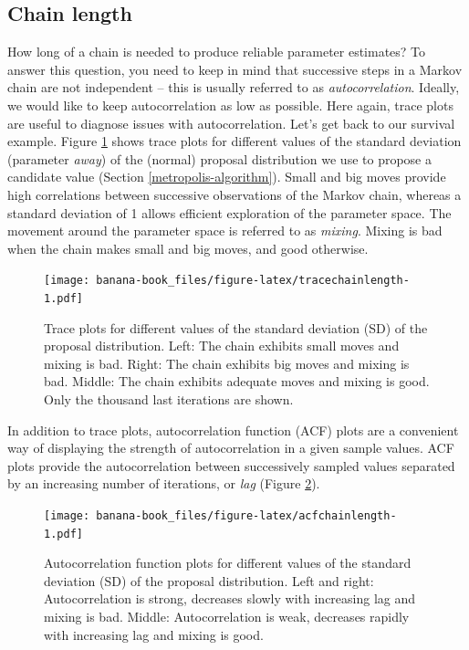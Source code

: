 \documentclass[
  12pt,
]{krantz}
\begin{document}
\hypertarget{chain-length}{%
\subsection{Chain length}\label{chain-length}}

How long of a chain is needed to produce reliable parameter estimates? To answer this question, you need to keep in mind that successive steps in a Markov chain are not independent -- this is usually referred to as \emph{autocorrelation}. Ideally, we would like to keep autocorrelation as low as possible. Here again, trace plots are useful to diagnose issues with autocorrelation. Let's get back to our survival example. Figure \ref{fig:tracechainlength} shows trace plots for different values of the standard deviation (parameter \emph{away}) of the (normal) proposal distribution we use to propose a candidate value (Section \ref{metropolis-algorithm}). Small and big moves provide high correlations between successive observations of the Markov chain, whereas a standard deviation of 1 allows efficient exploration of the parameter space. The movement around the parameter space is referred to as \emph{mixing}. Mixing is bad when the chain makes small and big moves, and good otherwise.

\begin{figure}
\centering
\texttt{[image: banana-book\_files/figure-latex/tracechainlength-1.pdf]}
\caption{\label{fig:tracechainlength}Trace plots for different values of the standard deviation (SD) of the proposal distribution. Left: The chain exhibits small moves and mixing is bad. Right: The chain exhibits big moves and mixing is bad. Middle: The chain exhibits adequate moves and mixing is good. Only the thousand last iterations are shown.}
\end{figure}

In addition to trace plots, autocorrelation function (ACF) plots are a convenient way of displaying the strength of autocorrelation in a given sample values. ACF plots provide the autocorrelation between successively sampled values separated by an increasing number of iterations, or \emph{lag} (Figure \ref{fig:acfchainlength}).

\begin{figure}
\centering
\texttt{[image: banana-book\_files/figure-latex/acfchainlength-1.pdf]}
\caption{\label{fig:acfchainlength}Autocorrelation function plots for different values of the standard deviation (SD) of the proposal distribution. Left and right: Autocorrelation is strong, decreases slowly with increasing lag and mixing is bad. Middle: Autocorrelation is weak, decreases rapidly with increasing lag and mixing is good.}
\end{figure}
\end{document}
